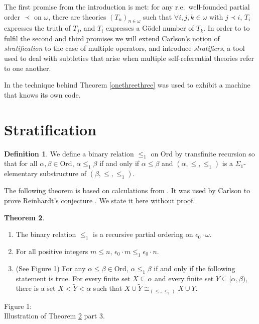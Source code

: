 \documentclass[reqno]{article}
\theoremstyle{definition}
\newtheorem{theorem}{Theorem}
\newtheorem{definition}[theorem]{Definition}
\def\epom{\epsilon_0\cdot\omega}
\begin{document}
The first promise from the introduction is met: for any
r.e.~well-founded partial order $\prec$ on $\omega$, there are theories
$(T_n)_{n\in\omega}$ such that $\forall i,j,k\in\omega$ with $j\prec i$, $T_i$ expresses
the truth of $T_j$, and $T_i$ expresses a G\"odel number of $T_k$.
In order to to fulfil the second and third promises
we will extend Carlson's notion of \emph{stratification} to the case of multiple
operators, and introduce \emph{stratifiers}, a tool used to deal with subtleties
that arise when multiple self-referential theories refer to one another.

In \cite{alexandercode} the technique behind Theorem \ref{onethreethree}
was used to exhibit a machine that knows its own code.


\section{Stratification}
\label{stratificationsection}

\begin{definition}
We define a binary relation $\leq_1$ on $\mathrm{Ord}$ by transfinite recursion
so that for all $\alpha,\beta\in\mathrm{Ord}$, $\alpha\leq_1\beta$ if and only if
$\alpha\leq\beta$ and $(\alpha,\leq,\leq_1)$ is a $\Sigma_1$-elementary substructure
of $(\beta,\leq,\leq_1)$.
\end{definition}

The following theorem is based on calculations from \cite{carlson1999}.
It was used by Carlson to prove Reinhardt's conjecture \cite{carlson2000}.
We state it here without proof.

\setlength{\columnsep}{-1.25in}
\begin{multicols}{2}


\begin{theorem}
\label{blackbox}
\item
\begin{enumerate}
\item The binary relation $\leq_1$ is a recursive partial ordering on $\epom$.
\item For all positive integers $m\leq n$, $\epsilon_0\cdot m\leq_1\epsilon_0\cdot n$.
\item (See Figure 1) For any $\alpha\leq\beta\in\mathrm{Ord}$, $\alpha\leq_1\beta$ if and only if
the following statement is true.  For every finite set $X\subseteq\alpha$
and every finite set $Y\subseteq[\alpha,\beta)$, there is a set
$X<\widetilde Y<\alpha$ such that $X\cup\widetilde Y\cong_{(\leq,\leq_1)}X\cup Y$.
\end{enumerate}
\end{theorem}

\columnbreak

%
{
\hspace{1in}


\hspace{1.5in}
\parbox[t][1in]{2in}{
Figure 1:\\
Illustration of Theorem \ref{blackbox} part 3.
}
}

\end{multicols}
\end{document}
